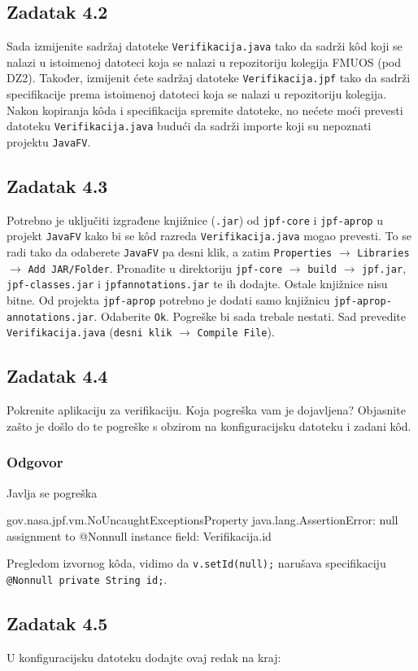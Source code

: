 \documentclass{article}
\newcommand{\zadatak}[1]{\subsection{Zadatak #1}}
\newcommand{\odgovor}{\subsubsection*{Odgovor}}
\newcommand{\code}[1]{\colorbox{blue!11}{\texttt{#1}}}
\begin{document}
\zadatak{4.2}

Sada izmijenite sadržaj datoteke \texttt{Verifikacija.java} tako da sadrži kôd koji se nalazi u istoimenoj datoteci koja se nalazi u repozitoriju kolegija FMUOS (pod DZ2). Također, izmijenit ćete sadržaj datoteke \texttt{Verifikacija.jpf} tako da sadrži specifikacije prema istoimenoj datoteci koja se nalazi u repozitoriju kolegija. Nakon kopiranja kôda i specifikacija spremite datoteke, no nećete moći prevesti datoteku \texttt{Verifikacija.java} budući da sadrži importe koji su nepoznati projektu \texttt{JavaFV}.

\zadatak{4.3}

Potrebno je uključiti izgrađene knjižnice (\texttt{.jar}) od \texttt{jpf-core} i \texttt{jpf-aprop} u projekt \texttt{JavaFV} kako bi se kôd razreda \texttt{Verifikacija.java} mogao prevesti. To se radi tako da odaberete \texttt{JavaFV} pa desni klik, a zatim \texttt{Properties} $\rightarrow$ \texttt{Libraries} $\rightarrow$ \texttt{Add JAR/Folder}. Pronađite u direktoriju \texttt{jpf-core} $\rightarrow$ \texttt{build} $\rightarrow$ \texttt{jpf.jar}, \texttt{jpf-classes.jar} i \texttt{jpfannotations.jar} te ih dodajte. Ostale knjižnice nisu bitne. Od projekta \texttt{jpf-aprop} potrebno je dodati samo knjižnicu \texttt{jpf-aprop-annotations.jar}. Odaberite \texttt{Ok}. Pogreške bi sada trebale nestati. Sad prevedite \texttt{Verifikacija.java} (\texttt{desni klik} $\rightarrow$ \texttt{Compile File}).

\zadatak{4.4}

Pokrenite aplikaciju za verifikaciju. Koja pogreška vam je dojavljena? Objasnite zašto je došlo do te pogreške s obzirom na konfiguracijsku datoteku i zadani kôd.

\odgovor

Javlja se pogreška

\begin{ccode}
gov.nasa.jpf.vm.NoUncaughtExceptionsProperty
java.lang.AssertionError: null assignment to @Nonnull instance field: Verifikacija.id
\end{ccode}


\noindent
Pregledom izvornog kôda, vidimo da \code{v.setId(null);} narušava specifikaciju\newline
\code{@Nonnull private String id;}.

\pagebreak  %

\zadatak{4.5}

U konfiguracijsku datoteku dodajte ovaj redak na kraj:
\end{document}
